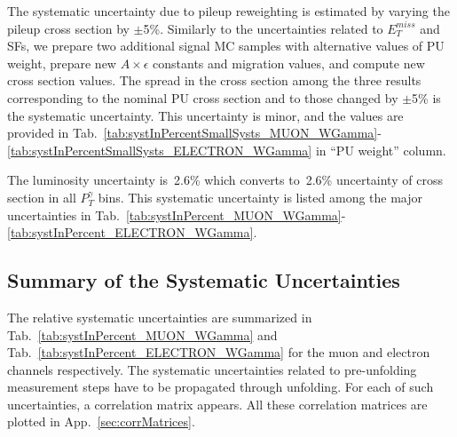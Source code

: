 

The systematic uncertainty due to pileup reweighting is estimated by varying the pileup cross section by $\pm$5\%. Similarly to the uncertainties related to $E_T^{miss}$ and SFs, we prepare two additional signal MC samples with alternative values of PU weight, prepare new $A \times \epsilon$ constants and migration values, and compute new cross section values. The spread in the cross section among the three results corresponding to the nominal PU cross section and to those changed by $\pm$5\% is the systematic uncertainty. This uncertainty is minor, and the values are provided in Tab.~\ref{tab:systInPercentSmallSysts_MUON_WGamma}-\ref{tab:systInPercentSmallSysts_ELECTRON_WGamma} in ``PU weight'' column.

The luminosity uncertainty is~2.6\% which converts to~2.6\% uncertainty of cross section in all $P_T^{\gamma}$ bins. This systematic uncertainty is listed among the major uncertainties in Tab.~\ref{tab:systInPercent_MUON_WGamma}-\ref{tab:systInPercent_ELECTRON_WGamma}.

\subsection{Summary of the Systematic Uncertainties}

The relative systematic uncertainties are summarized in Tab.~\ref{tab:systInPercent_MUON_WGamma} and Tab.~\ref{tab:systInPercent_ELECTRON_WGamma} for the muon and electron channels respectively. The systematic uncertainties related to pre-unfolding measurement steps have to be propagated through unfolding. For each of such uncertainties, a correlation matrix appears. All these correlation matrices are plotted in App.~\ref{sec:corrMatrices}.


